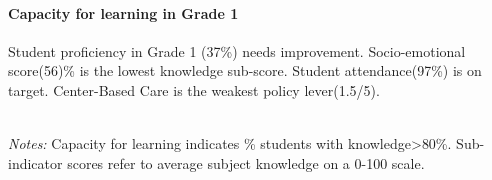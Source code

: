 \documentclass[
  twocolumn]{article}
\begin{document}
\hypertarget{capacity-for-learning-in-grade-1}{%
\paragraph{\texorpdfstring{\textbf{Capacity for learning in Grade
1}}{Capacity for learning in Grade 1}}\label{capacity-for-learning-in-grade-1}}

Student proficiency in Grade 1 (37\%) needs improvement. Socio-emotional
score(56)\% is the lowest knowledge sub-score. Student attendance(97\%)
is on target. Center-Based Care is the weakest policy lever(1.5/5).

\begin{table}[H]
\\
\color{darkgray}\scriptsize{\textit{Notes:} Capacity for learning indicates \% students with knowledge\textgreater{80\%}. Sub-indicator scores refer to average subject knowledge on a 0-100 scale.}
\end{table}
\vfill\null
\end{document}
